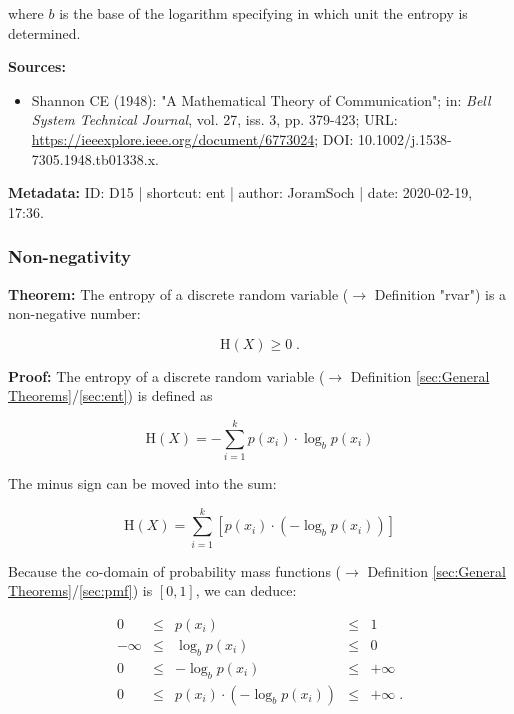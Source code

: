 \documentclass[a4paper,12pt]{book}
\begin{document}
where $b$ is the base of the logarithm specifying in which unit the entropy is determined.

\vspace{1em}
\textbf{Sources:}
\begin{itemize}
\item Shannon CE (1948): "A Mathematical Theory of Communication"; in: \textit{Bell System Technical Journal}, vol. 27, iss. 3, pp. 379-423; URL: \url{https://ieeexplore.ieee.org/document/6773024}; DOI: 10.1002/j.1538-7305.1948.tb01338.x.
\end{itemize}


\vspace{1em}
\textbf{Metadata:} ID: D15 | shortcut: ent | author: JoramSoch | date: 2020-02-19, 17:36.


\subsubsection[\textbf{Non-negativity}]{Non-negativity} \label{sec:ent-nonneg}

\vspace{1em}
\textbf{Theorem:} The entropy of a discrete random variable ($\rightarrow$ Definition "rvar") is a non-negative number:

\begin{equation} \label{eq:ent-nonneg-ent-nonneg}
\mathrm{H}(X) \geq 0 \; .
\end{equation}


\vspace{1em}
\textbf{Proof:} The entropy of a discrete random variable ($\rightarrow$ Definition \ref{sec:General Theorems}/\ref{sec:ent}) is defined as

\begin{equation} \label{eq:ent-nonneg-ent}
\mathrm{H}(X) = - \sum_{i=1}^{k} p(x_i) \cdot \log_b p(x_i)
\end{equation}

The minus sign can be moved into the sum:

\begin{equation} \label{eq:ent-nonneg-ent-dev}
\mathrm{H}(X) = \sum_{i=1}^{k} \left[ p(x_i) \cdot \left( - \log_b p(x_i) \right) \right]
\end{equation}

Because the co-domain of probability mass functions ($\rightarrow$ Definition \ref{sec:General Theorems}/\ref{sec:pmf}) is $[0,1]$, we can deduce:

\begin{equation} \label{eq:ent-nonneg-nonneg}
\begin{array}{rcccl}
0 &\leq &p(x_i) &\leq &1 \\
-\infty &\leq &\log_b p(x_i) &\leq &0 \\
0 &\leq &-\log_b p(x_i) &\leq &+\infty \\
0 &\leq &p(x_i) \cdot \left(-\log_b p(x_i)\right) &\leq &+\infty \; .
\end{array}
\end{equation}
\end{document}

